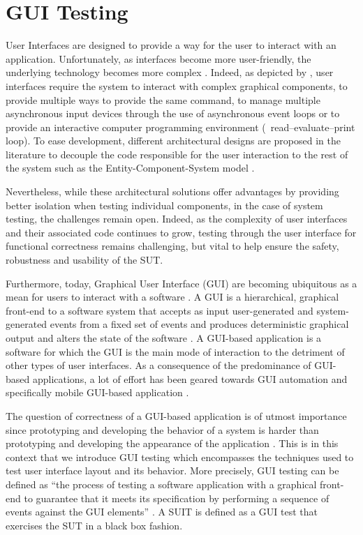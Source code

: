 \section{GUI Testing}
\label{sec:introduction-gui-testing}

User Interfaces are designed to provide a way for the user to interact with an application. Unfortunately, as interfaces become more user-friendly, the underlying technology becomes more complex \cite{Myers1994}. Indeed, as depicted by \textcite{Myers1995}, user interfaces require the system to  interact with complex graphical components, to provide multiple ways to provide the same command, to manage multiple asynchronous input devices through the use of asynchronous event loops or to provide an interactive computer programming environment (\eg\ read–evaluate–print loop). To ease development, different architectural designs are proposed in the literature to decouple the code responsible for the user interaction to the rest of the system such as the Entity-Component-System model \cite{Raffaillac2018}.

Nevertheless, while these architectural solutions offer advantages by providing better isolation when testing individual components, in the case of system testing, the challenges remain open. Indeed, as the complexity of user interfaces and their associated code continues to grow, testing through the user interface for functional correctness remains challenging, but vital to help ensure the safety, robustness and usability of the SUT.

Furthermore, today, Graphical User Interface (GUI) are becoming ubiquitous as a mean for users to interact with a software \cite{Myers1992, Myers1995, Brooks2009, Memon2010}. A GUI is a hierarchical, graphical front-end to a software system that accepts as input user-generated and system-generated events from a fixed set of events and produces deterministic graphical output \cite{Memon2007} and alters the state of the software \cite{Nguyen2014}. A GUI-based application is a software for which the GUI is the main mode of interaction to the detriment of other types of user interfaces. As a consequence of the predominance of GUI-based applications, a lot of effort has been geared towards GUI automation and specifically mobile GUI-based application \cite{Machiry2013, Gomez2013}.

The question of correctness of a GUI-based application is of utmost importance since prototyping and developing the behavior of a system is harder than prototyping and developing the appearance of the application \cite{Myers2008}. This is in this context that we introduce GUI testing which encompasses the techniques used to test user interface layout and its behavior. More precisely, GUI testing can be defined as ``the process of testing a software application with a graphical front-end to guarantee that it meets its specification by performing a sequence of events against the GUI elements'' \cite{Cunha2010, Banerjee2013, Issa2012}. A SUIT is defined as a GUI test that exercises the SUT in a black box fashion.


